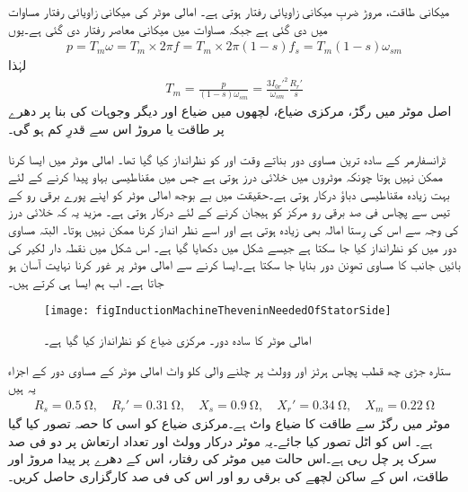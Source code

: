 میکانی طاقت، مروڑ ضربِ میکانی زاویائی رفتار ہوتی ہے۔ امالی موٹر کی میکانی زاویائی رفتار مساوات   میں دی گئی ہے جبکہ مساوات   میں میکانی معاصر رفتار  دی گئی ہے۔یوں
\begin{align}\label{مساوات_امالی_تین_دور_میکانی_طاقت_اور_رفتار}
p= T_m \omega =T_m \times 2 \pi f=T_m \times 2 \pi (1-s) f_s=T_m (1-s) \omega_{sm} 
\end{align}
لہٰذا
\begin{align}\label{مساوات_امالی_مروڑ_الف}
T_m=\frac{p}{(1-s) \omega_{sm}}=\frac{3 I_{0r}'^2}{\omega_{sm}} \frac{R_r'}{s}
\end{align}
اصل موٹر میں رگڑ، مرکزی ضیاع، لچھوں میں ضیاع اور دیگر وجوہات کی بنا پر دھرے پر طاقت یا مروڑ اس سے قدرِ کم ہو گی۔

ٹرانسفارمر کے سادہ ترین مساوی دور بناتے وقت  اور  کو نظرانداز کیا گیا تھا۔ امالی موٹر میں ایسا کرنا ممکن نہیں ہوتا چونکہ موٹروں میں خلائی درز ہوتی ہے جس میں مقناطیسی بہاو پیدا کرنے کے لئے بہت زیادہ مقناطیسی دباؤ درکار ہوتی ہے۔حقیقت میں بے بوجھ امالی موٹر کو اپنے پورے برقی رو کے تیس سے پچاس فی صد برقی رو مرکز کو ہیجان کرنے کے لئے درکار ہوتی ہے۔ مزید یہ کہ خلائی درز کی وجہ سے اس کی رِستا امالہ بھی زیادہ ہوتی ہے اور اسے نظر انداز کرنا ممکن نہیں ہوتا۔ البتہ مساوی دور میں  کو نظرانداز کیا جا سکتا ہے جیسے شکل  میں دکھایا گیا ہے۔ اس شکل میں نقطہ دار لکیر کی بائیں جانب کا مساوی تھوِنن دور بنایا جا سکتا ہے۔ایسا کرنے سے امالی موٹر پر غور کرنا نہایت آسان ہو جاتا ہے۔ اب ہم ایسا ہی کرتے ہیں۔
\begin{figure}
\centering
\texttt{[image: figInductionMachineTheveninNeededOfStatorSide]}
\caption{امالی موٹر کا سادہ دور۔ مرکزی ضیاع کو نظرانداز کیا گیا ہے۔}
\label{شکل_امالی_ساکن_حصے_کا_تھونن_دور}
\end{figure}
%
ستارہ جڑی چھ قطب پچاس ہرٹز اور   وولٹ پر چلنے والی   کلو واٹ امالی موٹر کے مساوی دور کے اجزاء یہ ہیں
\begin{align*}
R_s= \SI{0.5}{\ohm}, \quad R_r'=\SI{0.31}{\ohm}, \quad X_s=\SI{0.9}{\ohm}, \quad X_r'=\SI{0.34}{\ohm}, \quad X_m=\SI{0.22}{\ohm} 
\end{align*}
موٹر میں رگڑ سے طاقت کا ضیاع   واٹ ہے۔مرکزی ضیاع کو اسی کا حصہ تصور کیا گیا ہے۔ اس کو اٹل تصور کیا جائے۔یہ موٹر درکار وولٹ اور تعداد ارتعاش پر دو فی صد سرک پر چل رہی ہے۔اس حالت میں موٹر کی رفتار، اس کے دھرے پر پیدا مروڑ اور طاقت، اس کے ساکن لچھے کی برقی رو اور اس کی فی صد کارگزاری حاصل کریں۔

